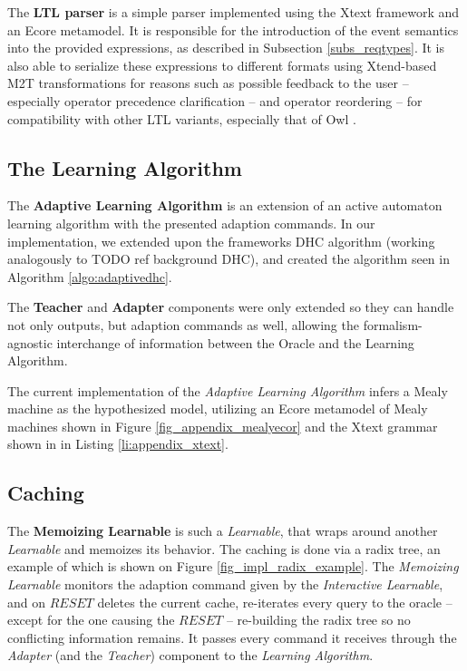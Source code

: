 The \textbf{LTL parser} is a simple parser implemented using the Xtext framework and an Ecore metamodel. It is responsible for the introduction of the event semantics into the provided expressions, as described in Subsection \ref{subs_reqtypes}. It is also able to serialize these expressions to different formats using Xtend-based M2T transformations for reasons such as possible feedback to the user -- especially operator precedence clarification -- and operator reordering -- for compatibility with other LTL variants, especially that of Owl \cite{Owl}.  

\subsection{The Learning Algorithm} \label{subsec_adaptivedhc}

The \textbf{Adaptive Learning Algorithm} is an extension of an active automaton learning algorithm with the presented adaption commands. In our implementation, we extended upon the frameworks DHC algorithm (working analogously to TODO ref background DHC), and created the algorithm seen in Algorithm \ref{algo:adaptivedhc}.

The \textbf{Teacher} and \textbf{Adapter} components were only extended so they can handle not only outputs, but adaption commands as well, allowing the formalism-agnostic interchange of information between the Oracle and the Learning Algorithm.

The current implementation of the \textit{Adaptive Learning Algorithm} infers a Mealy machine as the hypothesized model, utilizing an Ecore metamodel of Mealy machines shown in Figure \ref{fig_appendix_mealyecor} and the Xtext grammar shown in in Listing \ref{li:appendix_xtext}.



\subsection{Caching} \label{subsec_memoization}

The \textbf{Memoizing Learnable} is such a \textit{Learnable}, that wraps around another \textit{Learnable} and memoizes its behavior. The caching is done via a radix tree, an example of which is shown on Figure \ref{fig_impl_radix_example}. The \textit{Memoizing Learnable} monitors the adaption command given by the \textit{Interactive Learnable}, and on $RESET$ deletes the current cache, re-iterates every query to the oracle -- except for the one causing the $RESET$ -- re-building the radix tree so no conflicting information remains. It passes every command it receives through the \textit{Adapter} (and the \textit{Teacher}) component to the \textit{Learning Algorithm}.

